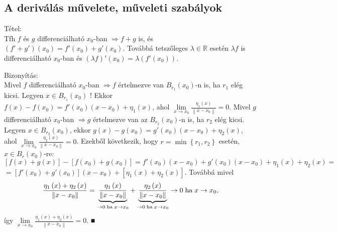 \documentclass[12pt,a4paper]{scrartcl}
\newenvironment{tetel}{}{}
\newenvironment{bizonyitas}{}{}
\begin{document}
\hypertarget{a-derivalas-muvelete-muveleti-szabalyok}{%
\subsection{A deriválás művelete, műveleti
szabályok}\label{a-derivalas-muvelete-muveleti-szabalyok}}

\begin{tetel}

Tétel:\\
Tfh \(f\) és \(g\) differenciálható \(x_{0}\)-ban
\(\left. \Rightarrow f + g \right.\) is, és
\(\left( {f' + g'} \right)\left( x_{0} \right) = f'\left( x_{0} \right) + g'\left( x_{0} \right)\).
Továbbá tetszőleges \(\lambda \in {\mathbb{R}}\) esetén \(\lambda f\) is
differenciálható \(x_{0}\)-ban és
\(\left( {\lambda f} \right)'\left( x_{0} \right) = \lambda\left( {f'\left( x_{0} \right)} \right)\).

\end{tetel}

\begin{bizonyitas}

Bizonyítás:\\
Mivel \(f\) differenciálható \(x_{0}\)-ban
\(\left. \Rightarrow f \right.\) értelmezve van
\(B_{r_{1}}\left( x_{0} \right)\)-n is, ha \(r_{1}\) elég kicsi. Legyen
\(x \in B_{r_{1}}\left( x_{0} \right)\) ! Ekkor
\(f\left( x \right) - f\left( x_{0} \right) = f'\left( x_{0} \right)\left( {x - x_{0}} \right) + \eta_{1}\left( x \right)\),
ahol
\(\underset{x\rightarrow x_{0}}{\lim}\frac{\eta_{1}\left( x \right)}{\left\| {x - x_{0}} \right\|} = 0\).
Mivel \(g\) differenciálható \(x_{0}\)-ban
\(\left. \Rightarrow g \right.\) értelmezve van az
\(B_{r_{2}}\left( x_{0} \right)\)-n is, ha \(r_{2}\) elég kicsi. Legyen
\(x \in B_{r_{2}}\left( x_{0} \right)\), ekkor
\(g\left( x \right) - g\left( x_{0} \right) = g'\left( x_{0} \right)\left( {x - x_{0}} \right) + \eta_{2}\left( x \right)\),
ahol
\(\underset{x\rightarrow x_{0}}{\lim}\frac{\eta_{2}\left( x \right)}{\left\| {x - x_{0}} \right\|} = 0\).
Ezekből következik, hogy \(r = \min\left\{ {r_{1},r_{2}} \right\}\)
esetén, \(x \in B_{r}\left( x_{0} \right)\)-re:
\(\left\lbrack {f\left( x \right) + g\left( x \right)} \right\rbrack - \left\lbrack {f\left( x_{0} \right) + g\left( x_{0} \right)} \right\rbrack = f'\left( x_{0} \right)\left( {x - x_{0}} \right) + g'\left( x_{0} \right)\left( {x - x_{0}} \right) + \eta_{1}\left( x \right) + \eta_{2}\left( x \right) =\)
\(= \left\lbrack {f'\left( x_{0} \right) + g'\left( x_{0} \right)} \right\rbrack\left( {x - x_{0}} \right) + \left\lbrack {\eta_{1}\left( x \right) + \eta_{2}\left( x \right)} \right\rbrack\).
Továbbá mivel
\[\frac{{{\eta _1}\left( x \right) + {\eta _2}\left( x \right)}}{{\left\| {x - {x_0}} \right\|}} = \underbrace {\frac{{{\eta _1}\left( x \right)}}{{\left\| {x - {x_0}} \right\|}}}_{ \to 0{\text{\;ha\;}}x \to {x_0}} + \underbrace {\frac{{{\eta _2}\left( x \right)}}{{\left\| {x - {x_0}} \right\|}}}_{ \to 0{\text{\;ha\;}}x \to {x_0}} \to 0{\text{\;ha\;}}x \to {x_0},\]így
\(\underset{x\rightarrow x_{0}}{\lim}\frac{\eta_{1}\left( x \right) + \eta_{2}\left( x \right)}{\left\| {x - x_{0}} \right\|} = 0\).
■

\end{bizonyitas}
\end{document}
